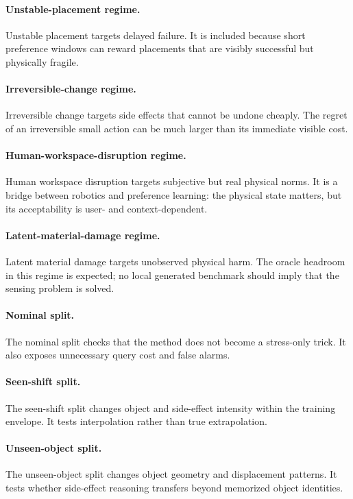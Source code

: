 \documentclass{article}
\begin{document}
\paragraph{Unstable-placement regime.}
Unstable placement targets delayed failure. It is included because short preference windows can reward placements that are visibly successful but physically fragile.

\paragraph{Irreversible-change regime.}
Irreversible change targets side effects that cannot be undone cheaply. The regret of an irreversible small action can be much larger than its immediate visible cost.

\paragraph{Human-workspace-disruption regime.}
Human workspace disruption targets subjective but real physical norms. It is a bridge between robotics and preference learning: the physical state matters, but its acceptability is user- and context-dependent.

\paragraph{Latent-material-damage regime.}
Latent material damage targets unobserved physical harm. The oracle headroom in this regime is expected; no local generated benchmark should imply that the sensing problem is solved.

\paragraph{Nominal split.}
The nominal split checks that the method does not become a stress-only trick. It also exposes unnecessary query cost and false alarms.

\paragraph{Seen-shift split.}
The seen-shift split changes object and side-effect intensity within the training envelope. It tests interpolation rather than true extrapolation.

\paragraph{Unseen-object split.}
The unseen-object split changes object geometry and displacement patterns. It tests whether side-effect reasoning transfers beyond memorized object identities.
\end{document}
